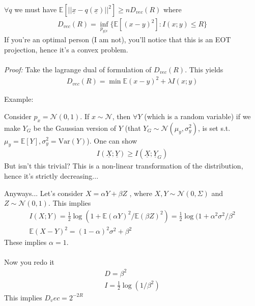 \begin{corollary}
	$\forall q$ we must have $\mathbb E[||\underline x - q(\underline x)||^2] \geq n  D_{vec}(R)$ where
	\begin{align}
		D_{vec}(R)=  \inf_{p_{y|x}} \{ \mathbb E[(x-y)^2] : I(x;y) \leq R\}
	\end{align} If you're an optimal person (I am not), you'll notice that this is an EOT projection, hence it's a convex problem.\\
	\\
	\emph{Proof:} Take the lagrange dual of formulation of $D_{vec}(R)$. This yields
	\begin{align}
		D_{vec}(R) = \min \mathbb E( x - y )^2 + \lambda I(x; y)
	\end{align}
\end{corollary}\begin{sidework}
	Example:
	
	Consider $p_x = \mathcal N(0,1)$. If $x \sim \mathcal N$, then $\forall Y$ (which is a random variable) if we make $Y_G$ be the Gaussian version of $Y$ (that $Y_G \sim \mathcal N(\mu_y, \sigma_y^2)$, is set s.t. $\mu_y = \mathbb E[Y], \sigma_y^2 = \text{Var}(Y)$). One can show
	\begin{align}
		I(\underline X; \underline Y) \geq I (\underline X; \underline Y_G)
	\end{align}
	But isn't this trivial? This is a non-linear transformation of the distribution, hence it's strictly decreasing...
	
	Anyways... Let's consider $X = \alpha Y + \beta Z$ , where $X,Y \sim \mathcal N(0, \Sigma)$ and $Z \sim \mathcal N(0,1)$. This implies
	\begin{align}
		I(X;  Y) = \frac{1}{2} \log ( 1 + \mathbb E(\alpha Y)^2  / \mathbb E(\beta Z)^2) = \frac{1}{2} \log (1 + \alpha^2 \sigma^2 / \beta^2\\
		\mathbb E(X-Y)^2 = (1- \alpha)^2 \sigma^2 + \beta^2 
	\end{align}
	These implies $\alpha = 1$.\\
	\\
	Now you redo it
	\begin{align}
		D = \beta^2\\
		I = \frac{1}{2} \log (1/\beta^2)
	\end{align}
	This implies $D_vec = 2^{-2R}$
\end{sidework}


